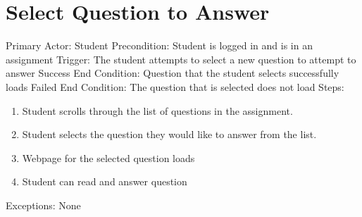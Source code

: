     \section{Select Question to Answer}
        Primary Actor: Student \newline
        Precondition: Student is logged in and is in an assignment         \newline
        Trigger: The student attempts to select a new question      to attempt to answer \newline
        Success End Condition: Question that the student selects     successfully loads \newline
        Failed End Condition: The question that is selected does     not load \newline
        \newline
        Steps:
        \begin{enumerate}
            \item{Student scrolls through the list of questions in the assignment.}
            \item{Student selects the question they would like to        answer from the list.}
            \item{Webpage for the selected question loads}
            \item{Student can read and answer question}
        \end{enumerate}
        Exceptions: None



